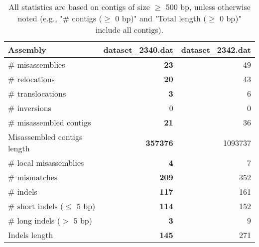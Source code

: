 \documentclass[12pt,a4paper]{article}
\begin{document}
\begin{table}[ht]
\begin{center}
\caption{All statistics are based on contigs of size $\geq$ 500 bp, unless otherwise noted (e.g., "\# contigs ($\geq$ 0 bp)" and "Total length ($\geq$ 0 bp)" include all contigs).}
\begin{tabular}{|l*{2}{|r}|}
\hline
Assembly & dataset\_2340.dat & dataset\_2342.dat \\ \hline
\# misassemblies & {\bf 23} & 49 \\ \hline
\hspace{5mm}\# relocations & {\bf 20} & 43 \\ \hline
\hspace{5mm}\# translocations & {\bf 3} & 6 \\ \hline
\hspace{5mm}\# inversions & 0 & 0 \\ \hline
\# misassembled contigs & {\bf 21} & 36 \\ \hline
Misassembled contigs length & {\bf 357376} & 1093737 \\ \hline
\# local misassemblies & {\bf 4} & 7 \\ \hline
\# mismatches & {\bf 209} & 352 \\ \hline
\# indels & {\bf 117} & 161 \\ \hline
\hspace{5mm}\# short indels ($\leq$ 5 bp) & {\bf 114} & 152 \\ \hline
\hspace{5mm}\# long indels ($>$ 5 bp) & {\bf 3} & 9 \\ \hline
Indels length & {\bf 145} & 271 \\ \hline
\end{tabular}
\end{center}
\end{table}
\end{document}
